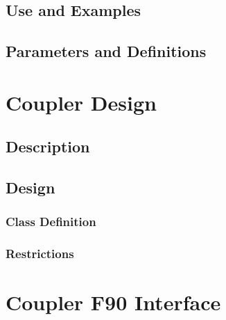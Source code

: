 \documentclass[]{article}
\begin{document}
\subsection{Use and Examples}




\subsection{Parameters and Definitions}











\section{Coupler Design}

\subsection{Description}




\subsection{Design}




\subsubsection{Class Definition}




\subsubsection{Restrictions}




\section{Coupler F90 Interface}
\end{document}
